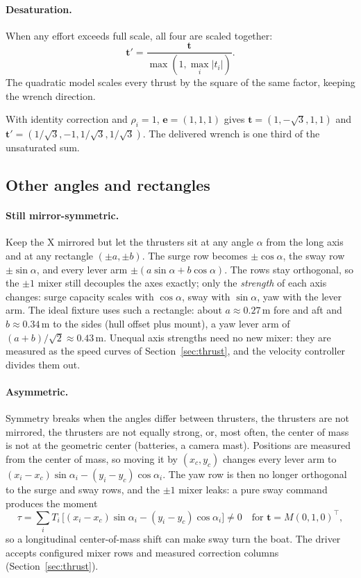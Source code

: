 \paragraph{Desaturation.} When any effort exceeds full scale, all four are
scaled together:
\[
  \bm t'=\frac{\bm t}{\max(1,\max_i|t_i|)}.
\]
The quadratic model scales every thrust by the square of the same factor,
keeping the wrench direction.
\begin{example}
With identity correction and $\rho_i=1$, $\bm e=(1,1,1)$ gives
$\bm t=(1,-\sqrt3,1,1)$ and
$\bm t'=(1/\sqrt3,-1,1/\sqrt3,1/\sqrt3)$. The delivered wrench is one third
of the unsaturated sum.
\end{example}

\subsection{Other angles and rectangles}

\paragraph{Still mirror-symmetric.} Keep the X mirrored but let the thrusters
sit at any angle $\alpha$ from the long axis and at any rectangle $(\pm a,
\pm b)$. The surge row becomes $\pm\cos\alpha$, the sway row $\pm\sin\alpha$,
and every lever arm $\pm(a\sin\alpha + b\cos\alpha)$. The rows stay
orthogonal, so the $\pm1$ mixer still decouples the axes exactly; only the
\emph{strength} of each axis changes: surge capacity scales with $\cos\alpha$,
sway with $\sin\alpha$, yaw with the lever arm. The ideal fixture uses such a
rectangle: about $a \approx 0.27$\,m fore and aft and $b \approx 0.34$\,m to
the sides (hull offset plus mount), a yaw lever arm of
$(a+b)/\sqrt2 \approx 0.43$\,m. Unequal axis strengths need no new mixer:
they are measured as the speed curves of Section~\ref{sec:thrust}, and the
velocity controller divides them out.

\paragraph{Asymmetric.} Symmetry breaks when the angles differ between
thrusters, the thrusters are not mirrored, the thrusters are not equally strong,
or, most often, the center of mass is not at the geometric center (batteries, a
camera mast). Positions are measured from the center of mass, so moving it by
$(x_c, y_c)$ changes every lever arm to
$(x_i - x_c)\sin\alpha_i - (y_i - y_c)\cos\alpha_i$. The yaw row is then no
longer orthogonal to the surge and sway rows, and the $\pm1$ mixer leaks: a pure
sway command produces the moment
\[
  \tau = \sum_i T_i\,\big[(x_i - x_c)\sin\alpha_i - (y_i - y_c)\cos\alpha_i\big]
  \neq 0 \quad\text{for } \bm t = M(0,1,0)^\top,
\]
so a longitudinal center-of-mass shift can make sway turn the boat. The driver
accepts configured mixer rows and measured correction columns (Section~\ref{sec:thrust}).
